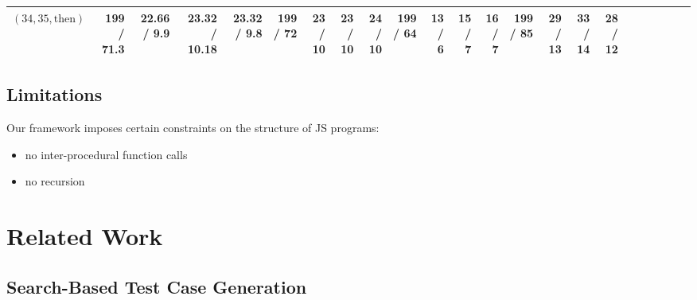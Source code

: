 \documentclass[sigconf]{acmart}
\newcommand{\thenBr}{\text{then}}
\newcommand{\elseBr}{\text{else}}
\newcommand{\inFor}{\text{inFor}}
\begin{document}
\begin{table*}
{\begin{tabular}{l|rrrr|rrrr|rrrr|rrrr|r|r|r|r|r|r}
    $(34,35,\thenBr)$    & 199    / 71.3    & 22.66  / 9.9   & 23.32  / 10.18 & 23.32  / 9.8   & 199  / 72   & 23  / 10 & 23  / 10    & 24  / 10   & 199  / 64  & 13  / 6   & 15  / 7  & 16  / 7   & 199  / 85  & 29  / 13  & 33  / 14  & 28  / 12  & & & & & & \\
    \bottomrule
    \end{tabular}
}
\end{table*}


\subsection{Limitations}
\label{sub.sec.eval.limit}

Our framework imposes certain constraints on the structure of JS programs:
\begin{itemize}
\item no inter-procedural function calls
\item no recursion  
\end{itemize}


\section{Related Work}
\label{sec:related.work}

\subsection{Search-Based Test Case Generation}
\label{sub.sec.search.based}
\end{document}
